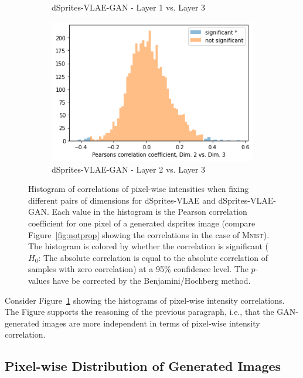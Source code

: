 \begin{figure}
\begin{subfigure}{.3\textwidth}
        \caption{dSprites-VLAE-GAN - Layer 1 vs. Layer 3}
    \end{subfigure}
    \hfill
    \begin{subfigure}{.3\textwidth}
        \includegraphics[width=\textwidth]{images/notprop/dsprites/vlae_gan/dim_2_3.png}
        \caption{dSprites-VLAE-GAN - Layer 2 vs. Layer 3}
    \end{subfigure}
    \caption[dSprites-VLAE and dSprites-VLAE-GAN - Pixel intensity correlation]{Histogram of correlations of pixel-wise intensities when fixing different pairs of dimensions for dSprites-VLAE and dSprites-VLAE-GAN.
    Each value in the histogram is the Pearson correlation coefficient for one pixel of a generated dsprites image (compare Figure~\ref{fig:notprop} showing the correlations in the case of \textsc{Mnist}).
    The histogram is colored by whether the correlation is significant ($H_0$: The absolute correlation is equal to the absolute correlation of samples with zero correlation) at a 95\% confidence level.
    The $p$-values have be corrected by the Benjamini/Hochberg method.}
    \label{fig:dsprites_vlae_notprop}
\end{figure}

Consider Figure~\ref{fig:dsprites_vlae_notprop} showing the histograms of pixel-wise intensity correlations.
The Figure supports the reasoning of the previous paragraph, i.e., that the \ac{GAN}-generated images are more independent in terms of pixel-wise intensity correlation.

\subsection{Pixel-wise Distribution of Generated Images}\label{subsubsec:pixel_wise_statistics}

